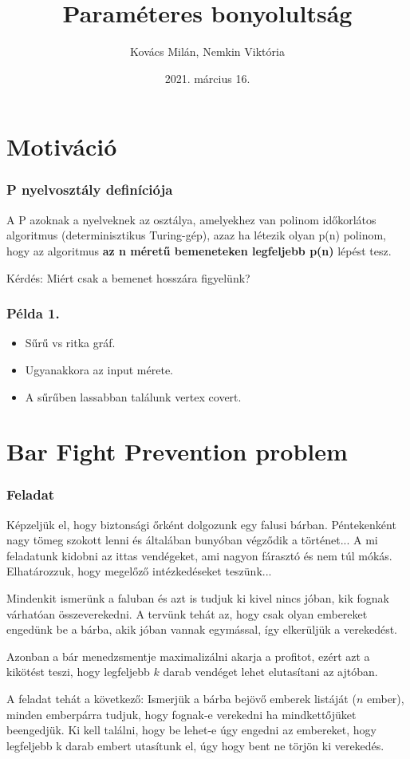 \documentclass[aspectratio=169]{beamer}
\begin{document}
\title{Paraméteres bonyolultság}
\author{Kovács Milán, Nemkin Viktória}
\date{2021. március 16.}

\frame{\titlepage}



\section{Motiváció}

\begin{frame}
\frametitle{P nyelvosztály definíciója}

A P azoknak a nyelveknek az osztálya, amelyekhez van polinom időkorlátos
algoritmus (determinisztikus Turing-gép), azaz ha létezik olyan p(n) polinom, hogy
az algoritmus \textbf{az n méretű bemeneteken legfeljebb p(n)} lépést tesz.

Kérdés: Miért csak a bemenet hosszára figyelünk? 

\end{frame}


\begin{frame}
\frametitle{Példa 1.}
\begin{itemize}
\item Sűrű vs ritka gráf.
\item Ugyanakkora az input mérete.
\item A sűrűben lassabban találunk vertex covert.
\end{itemize}
\end{frame}



\section{Bar Fight Prevention problem}

\begin{frame}
\frametitle{Feladat}
Képzeljük el, hogy biztonsági őrként dolgozunk egy falusi bárban. Péntekenként nagy tömeg szokott lenni és
általában bunyóban végződik a történet... A mi feladatunk kidobni az ittas vendégeket, ami nagyon fárasztó
és nem túl mókás. Elhatározzuk, hogy megelőző intézkedéseket teszünk...

Mindenkit ismerünk a faluban és azt is tudjuk ki kivel nincs jóban, kik fognak várhatóan összeverekedni.
A tervünk tehát az, hogy csak olyan embereket engedünk be a bárba, akik jóban vannak egymással, így
elkerüljük a verekedést.

Azonban a bár menedzsmentje maximalizálni akarja a profitot, ezért azt a kikötést teszi, hogy legfeljebb
$k$ darab vendéget lehet elutasítani az ajtóban.

A feladat tehát a következő: Ismerjük a bárba bejövő emberek listáját ($n$ ember), minden emberpárra
tudjuk, hogy fognak-e verekedni ha mindkettőjüket beengedjük. Ki kell találni, hogy be lehet-e úgy
engedni az embereket, hogy legfeljebb k darab embert utasítunk el, úgy hogy bent ne törjön ki verekedés.
\end{frame}
\end{document}
